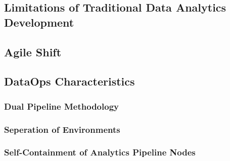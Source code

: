 
\subsection{Limitations of Traditional Data Analytics Development}

\subsection{Agile Shift}

\subsection{DataOps Characteristics}

\subsubsection{Dual Pipeline Methodology}

\subsubsection{Seperation of Environments}

\subsubsection{Self-Containment of Analytics Pipeline Nodes}